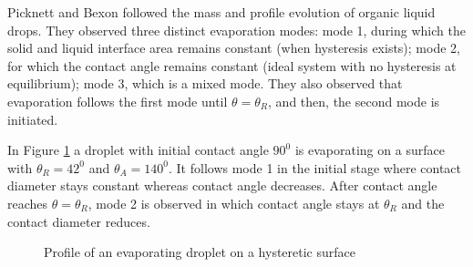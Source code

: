 \documentclass[11pt]{article}
\begin{document}
\par
Picknett and Bexon\cite{PICKNETT1977336} followed the mass and profile evolution of organic liquid drops. They observed three
distinct evaporation modes: mode 1, during which the
solid and liquid interface area remains constant (when hysteresis
exists); mode 2, for which the contact angle remains
constant (ideal system with no hysteresis at equilibrium);
mode 3, which is a mixed mode. They also observed that evaporation follows the first mode until $\theta = \theta_{R}$, and then, the second mode is initiated.\cite{doi:10.1021/la00007a076}


\par
In Figure \ref*{fig:evpn_cah} a droplet with initial contact angle $90^{0}$ is evaporating on a surface with $\theta_{R} = 42^{0}$ and $\theta_{A} = 140^{0}$. It follows mode 1 in the initial stage where contact diameter stays constant whereas contact angle decreases. After contact angle reaches $\theta = \theta_{R}$, mode 2 is observed in which contact angle stays at $\theta_{R}$ and the contact diameter reduces. 
\begin{figure}[h!]
	\begin{center}
		\caption{Profile of an evaporating droplet on a hysteretic surface }
		\label{fig:evpn_cah}
	\end{center}
	
\end{figure}
\end{document}
